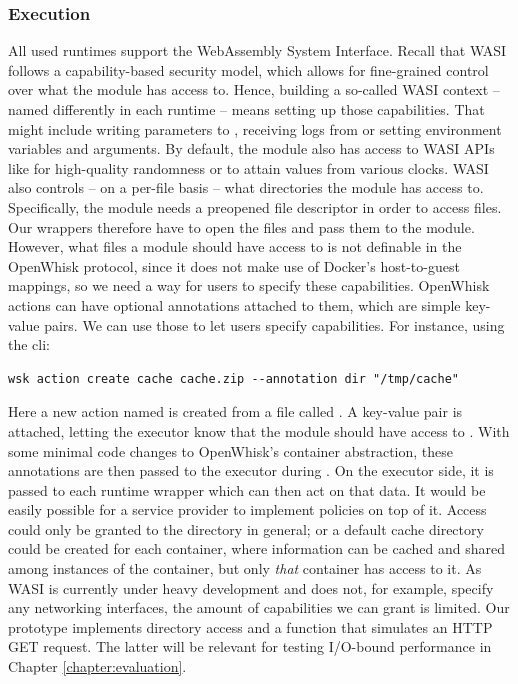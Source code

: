 \subsubsection{Execution}

All used runtimes support the WebAssembly System Interface. Recall that WASI follows a capability-based security model, which allows for fine-grained control over what the module has access to. Hence, building a so-called WASI context -- named differently in each runtime -- means setting up those capabilities. That might include writing parameters to , receiving logs from  or setting environment variables and  arguments. By default, the module also has access to WASI APIs like  for high-quality randomness or  to attain values from various clocks. WASI also controls -- on a per-file basis -- what directories the module has access to. Specifically, the module needs a preopened file descriptor in order to access files. Our wrappers therefore have to open the files and pass them to the module. However, what files a module should have access to is not definable in the OpenWhisk protocol, since it does not make use of Docker's host-to-guest mappings, so we need a way for users to specify these capabilities. OpenWhisk actions can have optional annotations attached to them, which are simple key-value pairs. We can use those to let users specify capabilities. For instance, using the  cli:

\begin{verbatim}
wsk action create cache cache.zip --annotation dir "/tmp/cache"
\end{verbatim}

Here a new action named  is created from a file called . A key-value pair  is attached, letting the executor know that the module should have access to . With some minimal code changes to OpenWhisk's container abstraction, these annotations are then passed to the executor during . On the executor side, it is passed to each runtime wrapper which can then act on that data. It would be easily possible for a service provider to implement policies on top of it. Access could only be granted to the  directory in general; or a default cache directory  could be created for each container, where information can be cached and shared among instances of the container, but only \emph{that} container has access to it. As WASI is currently under heavy development and does not, for example, specify any networking interfaces, the amount of capabilities we can grant is limited. Our prototype implements directory access and a function that simulates an HTTP GET request. The latter will be relevant for testing I/O-bound performance in Chapter \ref{chapter:evaluation}.



